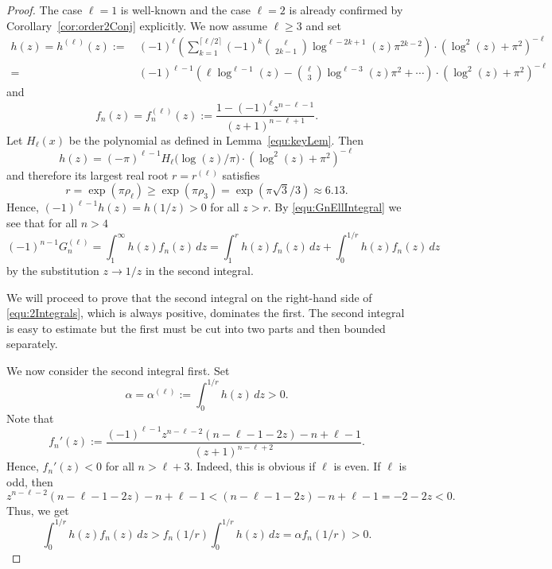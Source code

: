 \documentclass[10pt,a4paper]{amsart}
\begin{document}
\begin{proof} The case $\ell=1$ is well-known and the case $\ell=2$ is already confirmed by Corollary~\ref{cor:order2Conj} explicitly. We now assume $\ell\ge 3$ and set
\begin{align*}
h(z)=h^{(\ell)}(z):= &\, (-1)^{\ell} \left( \sum_{k=1}^{\lceil \ell/2\rceil} (-1)^k \binom{\ell}{2k-1}
               \log^{\ell-2k+1}(z) \pi^{2k-2}  \right)\cdot  (\log^2(z)+\pi^2)^{-\ell} \\
=&\, (-1)^{\ell-1} \left(\ell \log^{\ell-1}(z)-\binom{\ell}{3} \log^{\ell-3}(z)\pi^2+ \cdots\right) \cdot  (\log^2(z)+\pi^2)^{-\ell}
\end{align*}
and
\begin{equation*}
f_n(z)=f_n^{(\ell)}(z):=\frac{1-(-1)^{\ell} z^{n-\ell-1}}{(z+1)^{n-\ell+1}}.
\end{equation*}
Let $H_\ell(x)$ be the polynomial as defined in Lemma~\ref{equ:keyLem}. Then
\begin{equation*}
h(z)=(-\pi)^{\ell-1}H_{\ell}\big(\log(z)/\pi\big) \cdot (\log^2(z)+\pi^2)^{-\ell}
\end{equation*}
and therefore its largest real root $r=r^{(\ell)}$ satisfies
\begin{equation*}
r=\exp(\pi \rho_\ell)\ge \exp(\pi \rho_3)=\exp(\pi\sqrt{3}/3)\approx 6.13.
\end{equation*}
Hence, $(-1)^{\ell-1} h(z) = h(1/z) >0$ for all $z>r$. By \eqref{equ:GnEllIntegral} we see that for all $n>4$
\begin{equation}\label{equ:2Integrals}
(-1)^{n-1} G_n^{(\ell)}
= \int_1^\infty h(z) f_n(z)\, dz
= \int_1^{r} h(z)  f_n(z)\, dz+\int_0^{1/r} h(z)  f_n(z)\, dz
\end{equation}
by the substitution $z\to 1/z$ in the second integral.

We will proceed to prove that the second integral on the right-hand side of \eqref{equ:2Integrals},
which is always positive, dominates the first. The second integral is easy to estimate
but the first must be cut into two parts and then bounded separately.

We now consider the second integral first. Set
\begin{equation}\label{equ:alpha}
\alpha=\alpha^{(\ell)}:=\int_0^{1/r}  h(z) \, dz>0.
\end{equation}
Note that
\begin{equation*}
     f_n'(z):=\frac{ (-1)^{\ell-1}z^{n-\ell-2}(n-\ell-1-2z)-n+\ell-1}{(z+1)^{n-\ell+2}}.
\end{equation*}
Hence, $f_n'(z)<0$ for all $n>\ell+3$. Indeed, this is obvious if $\ell$ is even. If $\ell$ is odd, then
\begin{equation*}
    z^{n-\ell-2}(n-\ell-1-2z)-n+\ell-1<(n-\ell-1-2z)-n+\ell-1=-2-2z<0.
\end{equation*}
Thus, we get
\begin{equation}\label{equ:2ndIntegralBd}
 \int_0^{1/r} h(z)  f_n(z)  \, dz > f_n(1/r) \int_0^{1/r}  h(z)  \, dz =\alpha f_n(1/r)>0.
\end{equation}


\end{proof}
\end{document}
